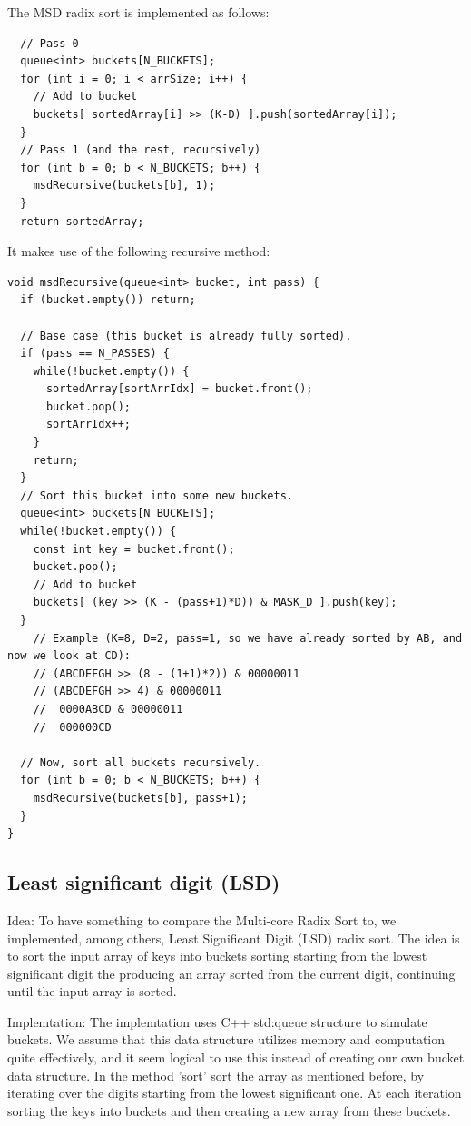 The MSD radix sort is implemented as follows:
\begin{verbatim}
  // Pass 0
  queue<int> buckets[N_BUCKETS];
  for (int i = 0; i < arrSize; i++) {
    // Add to bucket
    buckets[ sortedArray[i] >> (K-D) ].push(sortedArray[i]);
  }
  // Pass 1 (and the rest, recursively)
  for (int b = 0; b < N_BUCKETS; b++) {
    msdRecursive(buckets[b], 1);
  }
  return sortedArray;
\end{verbatim}


It makes use of the following recursive method:
\begin{verbatim}
void msdRecursive(queue<int> bucket, int pass) {
  if (bucket.empty()) return;
  
  // Base case (this bucket is already fully sorted).
  if (pass == N_PASSES) {
    while(!bucket.empty()) {
      sortedArray[sortArrIdx] = bucket.front();
      bucket.pop();
      sortArrIdx++;
    }
    return;
  }
  // Sort this bucket into some new buckets.
  queue<int> buckets[N_BUCKETS];
  while(!bucket.empty()) {
    const int key = bucket.front();
    bucket.pop();
    // Add to bucket
    buckets[ (key >> (K - (pass+1)*D)) & MASK_D ].push(key);
  }
    // Example (K=8, D=2, pass=1, so we have already sorted by AB, and now we look at CD):
    // (ABCDEFGH >> (8 - (1+1)*2)) & 00000011
    // (ABCDEFGH >> 4) & 00000011
    //  0000ABCD & 00000011
    //  000000CD

  // Now, sort all buckets recursively.
  for (int b = 0; b < N_BUCKETS; b++) {
    msdRecursive(buckets[b], pass+1);
  }
}
\end{verbatim}



\subsection{Least significant digit (LSD)}
Idea:
To have something to compare the Multi-core Radix Sort to, we implemented, among others, Least Significant Digit (LSD) radix sort. 
The idea is to sort the input array of keys into buckets sorting starting from the lowest significant digit the producing an array sorted from the current digit, continuing until the input array is sorted. 

Implemtation:
The implemtation uses C++ std:queue structure to simulate buckets. We assume that this data structure utilizes memory and computation quite effectively, and it seem logical to use this instead of creating our own bucket data structure.
In the method 'sort' sort the array as mentioned before, by iterating over the digits starting from the lowest significant one. At each iteration sorting the keys into buckets and then creating a new array from these buckets.


